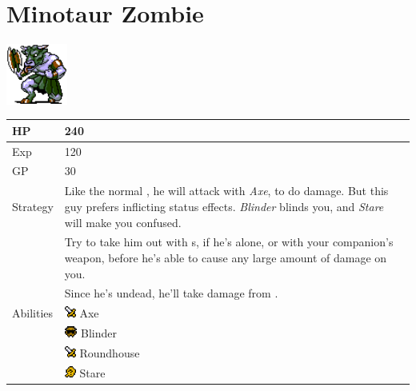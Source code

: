 \section{Minotaur Zombie}
\label{monster:minotaur_zombie}

\includegraphics[height=2cm,keepaspectratio]{./resources/monster/minotaur_zombie}

\begin{longtable}{ l p{9cm} }
	HP
	& 240
\\ \hline
	Exp
	& 120
\\ \hline
	GP
	& 30
\\ \hline
	Strategy
	& Like the normal \nameref{monster:minotaur}, he will attack with \textit{Axe}, to do damage. But this guy prefers inflicting status effects. \textit{Blinder} blinds you, and \textit{Stare} will make you confused. \\
	& Try to take him out with \nameref{weapon:bomb}s, if he's alone, or with your companion's weapon, before he's able to cause any large amount of damage on you. \\
	& Since he's undead, he'll take damage from \nameref{spell:cure}.
\\ \hline
	Abilities
	& \includegraphics[height=1em,keepaspectratio]{./resources/effects/damage} Axe \\
	& \includegraphics[height=1em,keepaspectratio]{./resources/effects/blind} Blinder \\
	& \includegraphics[height=1em,keepaspectratio]{./resources/effects/damage} Roundhouse \\
	& \includegraphics[height=1em,keepaspectratio]{./resources/effects/confusion} Stare
\end{longtable}
